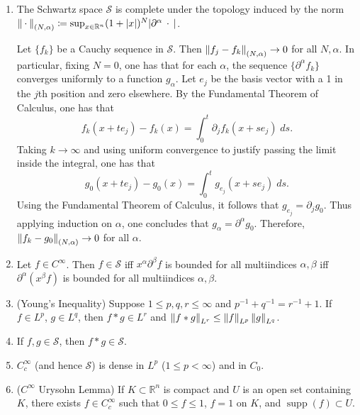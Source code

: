 \documentclass{article}
\begin{document}
\begin{enumerate}[resume=real_analysis]
		\item The Schwartz space $\mathscr{S}$ is complete under the topology induced by the norm $\left\Vert \hspace{2pt}\cdot\hspace{2pt} \right\Vert_{(N, \alpha)} \coloneqq \sup_{x \in \mathbb{R}^{n}}(1 + |x|)^{N}|\partial^{\alpha}\hspace{2pt}\cdot\hspace{2pt}|$. \newline 
		\begin{solutions}
			Let $\{f_{k}\}$ be a Cauchy sequence in $\mathscr{S}$. Then $\left\Vert f_{j} - f_{k} \right\Vert_{(N,\alpha)} \to 0$ for all $N, \alpha$. In particular, fixing $N = 0$, one has that for each $\alpha$, the sequence $\{\partial^{\alpha}f_{k}\}$ converges uniformly to a function $g_{\alpha}$. Let $e_{j}$ be the basis vector with a 1 in the $j$th position and zero elsewhere. By the Fundamental Theorem of Calculus, one has that 
			\begin{equation*}
				f_{k}(x + te_{j}) - f_{k}(x) = \int_{0}^{t}\partial_{j}f_{k}(x + se_{j})\;ds. 
			\end{equation*}
			Taking $k \to \infty$ and using uniform convergence to justify passing the limit inside the integral, one has that 
			\begin{equation*}
				g_{0}(x + te_{j}) - g_{0}(x) = \int_{0}^{t}g_{e_{j}}(x + se_{j})\;ds. 
			\end{equation*}
			Using the Fundamental Theorem of Calculus, it follows that $g_{e_{j}} = \partial_{j}g_{0}$. Thus applying induction on $\alpha$, one concludes that $g_{\alpha} = \partial^{\alpha}g_{0}$. Therefore, $\left\Vert f_{k} - g_{0} \right\Vert_{(N,\alpha)} \to 0$ for all $\alpha$. 
		\end{solutions}
		\item Let $f \in C^{\infty}$. Then $f \in \mathscr{S}$ iff $x^{\alpha}\partial^{\beta}f$ is bounded for all multiindices $\alpha,\beta$ iff $\partial^{\alpha}(x^{\beta}f)$ is bounded for all multiindices $\alpha,\beta$. 
		\item (Young's Inequality) Suppose $1 \leq p, q, r \leq \infty$ and $p^{-1} + q^{-1} = r^{-1} + 1$. If $f \in L^{p}$, $g \in L^{q}$, then $f \ast g \in L^{r}$ and $\left\Vert f \ast g \right\Vert_{L^{r}} \leq \left\Vert f \right\Vert_{L^{p}}\left\Vert g \right\Vert_{L^{q}}$. 
		\item If $f, g \in \mathscr{S}$, then $f\ast g \in \mathscr{S}$.
		\item $C_{c}^{\infty}$ (and hence $\mathscr{S}$) is dense in $L^{p}$ ($1 \leq p < \infty$) and in $C_{0}$. 
		\item ($C^{\infty}$ Urysohn Lemma) If $K \subset \mathbb{R}^{n}$ is compact and $U$ is an open set containing $K$, there exists $f \in C_{c}^{\infty}$ such that $0 \leq f \leq 1$, $f = 1$ on $K$, and $\operatorname{supp}(f) \subset U$. 

\end{enumerate}
\end{document}
